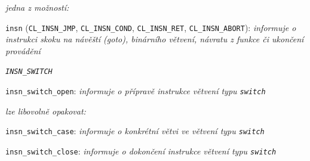 \smallskip
\begin{myitemize}[itemsep=0pt,partopsep=0pt,parsep=0pt,topsep=0pt,label=\textbullet]
  \item[\ndash] \textsl{jedna z možností:}
    \begin{myitemize}[itemsep=0pt,partopsep=0pt,parsep=0pt,topsep=0pt,label=\textbullet]
      \item \texttt{insn} (\texttt{CL\_INSN\_JMP},
                           \texttt{CL\_INSN\_COND}, 
                           \texttt{CL\_INSN\_RET}, 
                           \texttt{CL\_INSN\_ABORT}): \textit{informuje o instrukci
                                                              skoku na návěští (goto),
                                                              binárního větvení,
                                                              návratu z funkce
                                                              či ukončení provádění}
      \item[\whitebullet] \texttt{\textit{INSN\_SWITCH}}
        \begin{myitemize}[itemsep=0pt,partopsep=0pt,parsep=0pt,topsep=0pt,label=\textbullet]
          \item \texttt{insn\_switch\_open}: \textit{informuje o přípravě instrukce větvení typu \texttt{switch}}
          \item[\ndash] \textsl{lze libovolně opakovat:}
            \begin{myitemize}[itemsep=0pt,partopsep=0pt,parsep=0pt,topsep=0pt,label=\textbullet]
              \item \texttt{insn\_switch\_case}: \textit{informuje o konkrétní větvi ve větvení typu \texttt{switch}}
            \end{myitemize}
          \item \texttt{insn\_switch\_close}: \textit{informuje o dokončení instrukce větvení typu \texttt{switch}}
        \end{myitemize}
    \end{myitemize}
\end{myitemize}
